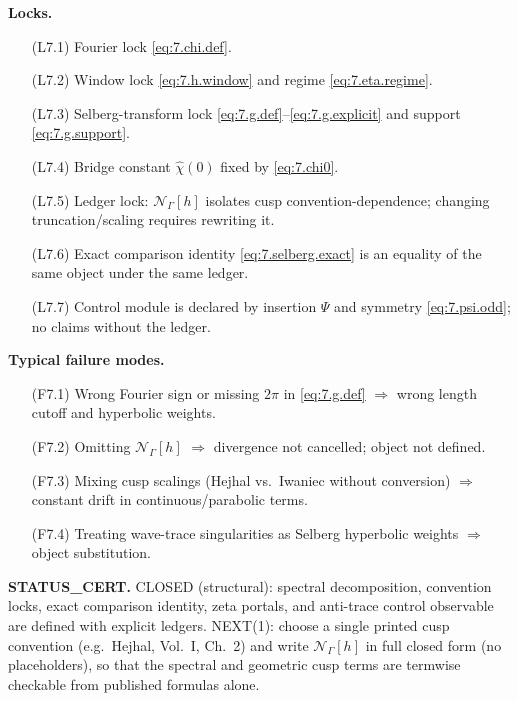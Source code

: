 \noindent\textbf{Locks.}
\begin{itemize}
\item[(L7.1)] Fourier lock \eqref{eq:7.chi.def}.
\item[(L7.2)] Window lock \eqref{eq:7.h.window} and regime \eqref{eq:7.eta.regime}.
\item[(L7.3)] Selberg-transform lock \eqref{eq:7.g.def}--\eqref{eq:7.g.explicit} and support \eqref{eq:7.g.support}.
\item[(L7.4)] Bridge constant $\widehat\chi(0)$ fixed by \eqref{eq:7.chi0}.
\item[(L7.5)] Ledger lock: $\mathcal N_\Gamma[h]$ isolates cusp convention-dependence; changing truncation/scaling requires rewriting it.
\item[(L7.6)] Exact comparison identity \eqref{eq:7.selberg.exact} is an equality of the same object under the same ledger.
\item[(L7.7)] Control module is declared by insertion $\Psi$ and symmetry \eqref{eq:7.psi.odd}; no claims without the ledger.
\end{itemize}

\medskip
\noindent\textbf{Typical failure modes.}
\begin{itemize}
\item[(F7.1)] Wrong Fourier sign or missing $2\pi$ in \eqref{eq:7.g.def} $\Rightarrow$ wrong length cutoff and hyperbolic weights.
\item[(F7.2)] Omitting $\mathcal N_\Gamma[h]$ $\Rightarrow$ divergence not cancelled; object not defined.
\item[(F7.3)] Mixing cusp scalings (Hejhal vs.\ Iwaniec without conversion) $\Rightarrow$ constant drift in continuous/parabolic terms.
\item[(F7.4)] Treating wave-trace singularities as Selberg hyperbolic weights $\Rightarrow$ object substitution.
\end{itemize}

\medskip
\noindent\textbf{STATUS\_CERT.}
CLOSED (structural): spectral decomposition, convention locks, exact comparison identity, zeta portals, and anti-trace control observable
are defined with explicit ledgers.
NEXT(1): choose a single printed cusp convention (e.g.\ Hejhal, Vol.~I, Ch.~2) and write $\mathcal N_\Gamma[h]$ in full closed form
(no placeholders), so that the spectral and geometric cusp terms are termwise checkable from published formulas alone.
